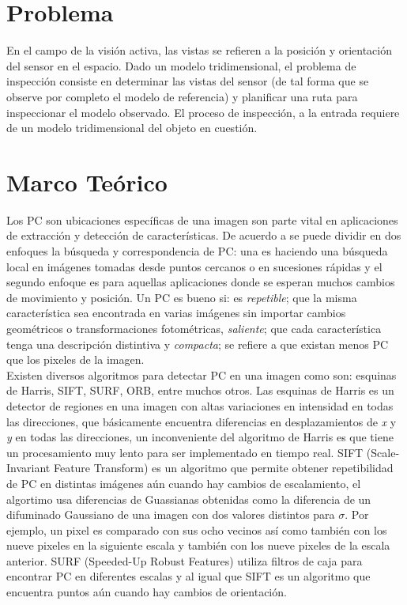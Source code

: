 \documentclass[]{report}
\begin{document}
\section{Problema}
En el campo de la visión activa, las vistas se refieren a la posición y orientación del sensor en el espacio. Dado un modelo tridimensional, el problema de inspección consiste en determinar las vistas del sensor (de tal forma que se observe por completo el modelo de referencia) y planificar una ruta para inspeccionar el modelo observado. El proceso de inspección, a la entrada requiere de un modelo tridimensional del objeto en cuestión.

\section{Marco Teórico}
Los PC son ubicaciones específicas de una imagen son parte vital en aplicaciones de extracción y detección de características. De acuerdo a \cite{szeliski2010computer} se puede dividir en dos enfoques la búsqueda y correspondencia de PC: una es haciendo una búsqueda local en imágenes tomadas desde puntos cercanos o en sucesiones rápidas y el segundo enfoque es para aquellas aplicaciones donde se esperan muchos cambios de movimiento y posición. Un PC es bueno si: es \textit{repetible}; que la misma característica sea encontrada en varias imágenes sin importar cambios geométricos o transformaciones fotométricas, \textit{saliente}; que cada característica tenga una descripción distintiva y \textit{compacta}; se refiere a que existan menos PC que los pixeles de la imagen.\\
Existen diversos algoritmos para detectar PC en una imagen como son: esquinas de Harris, SIFT, SURF, ORB, entre muchos otros. Las esquinas de Harris es un detector de regiones en una imagen con altas variaciones en intensidad en todas las direcciones, que básicamente encuentra diferencias en desplazamientos de \textit{x} y \textit{y} en todas las direcciones, un inconveniente del algoritmo de Harris es que tiene un procesamiento muy lento para ser implementado en tiempo real. SIFT (Scale-Invariant Feature Transform) es un algoritmo que permite obtener repetibilidad de PC en distintas imágenes aún cuando hay cambios de escalamiento, el algortimo usa diferencias de Guassianas obtenidas como la diferencia de un difuminado Gaussiano de una imagen con dos valores distintos para $\sigma$. Por ejemplo, un pixel es comparado con sus ocho vecinos así como también con los nueve pixeles en la siguiente escala y también con los nueve pixeles de la escala anterior. SURF (Speeded-Up Robust Features) utiliza filtros de caja para encontrar PC en diferentes escalas y al igual que SIFT es un algoritmo que encuentra puntos aún cuando hay cambios de orientación.\\
\end{document}
